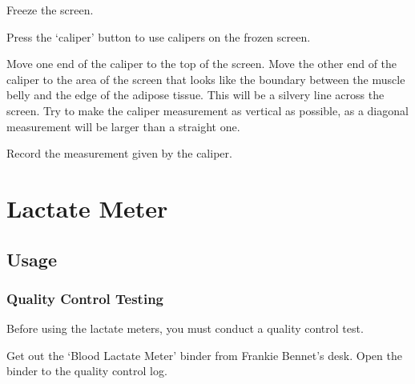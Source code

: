 \documentclass[
]{book}
\begin{document}
Freeze the screen.

Press the `caliper' button to use calipers on the frozen screen.

Move one end of the caliper to the top of the screen. Move the other end of the caliper to the area of the screen that looks like the boundary between the muscle belly and the edge of the adipose tissue. This will be a silvery line across the screen. Try to make the caliper measurement as vertical as possible, as a diagonal measurement will be larger than a straight one.

Record the measurement given by the caliper.

\hypertarget{Appendix-Instruments-LactateMeter}{%
\section{Lactate Meter}\label{Appendix-Instruments-LactateMeter}}

\hypertarget{Appendix-Instruments-LactateMeter-Usage}{%
\subsection{Usage}\label{Appendix-Instruments-LactateMeter-Usage}}

\hypertarget{Appendix-Instruments-LactateMeter-Usage-QualityControl}{%
\subsubsection{Quality Control Testing}\label{Appendix-Instruments-LactateMeter-Usage-QualityControl}}

Before using the lactate meters, you must conduct a quality control test.

Get out the `Blood Lactate Meter' binder from Frankie Bennet's desk. Open the binder to the quality control log.
\end{document}
